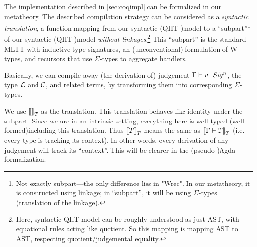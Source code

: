 The implementation described in \cref{sec:coqimpl} can be formalized in
our metatheory. The described compilation strategy can be considered as
a \textit{syntactic translation}, a function mapping from our syntactic
(QIIT-)model to a ``subpart''\footnote{Not exactly subpart---the only
difference lies in "Wrec". In our metatheory, it is constructed
using linkage; in ``subpart'', it will be using $\Sigma$-types (translation
of the linkage).} of our syntactic (QIIT-)model \textit{without
linkages}.\footnote{Here, syntactic QIIT-model can be roughly understood
as just AST, with equational rules acting like quotient. So this mapping
is mapping AST to AST, respecting quotient/judgemental equality.} This
``subpart'' is the standard MLTT with inductive type signatures, an
(unconventional) formulation of W-types,
and recursors that use $\Sigma$-types to aggregate handlers.

Basically, we can compile away (the derivation of) judgement ${ {\Gamma} \vdash {v} \ \ Sig^{n} }$,
the type ${\mathcal{L}}$ and ${\mathcal{C}}$, and related terms, by transforming them into
corresponding $\Sigma$-types.

 


We use ${{\llbracket {} \rrbracket}_T}$ as the translation. This translation behaves like identity
under the subpart. Since we are in an intrinsic setting, everything here
is well-typed (well-formed)including this translation. Thus
${{\llbracket {T} \rrbracket}_T}$ means the same as ${{\llbracket {{ {\Gamma} \vdash {T} }} \rrbracket}_T}$
(i.e. every type is tracking its context). In other words, every
derivation of any judgement will track its ``context''. This will be
clearer in the (pseudo-)Agda formalization.

